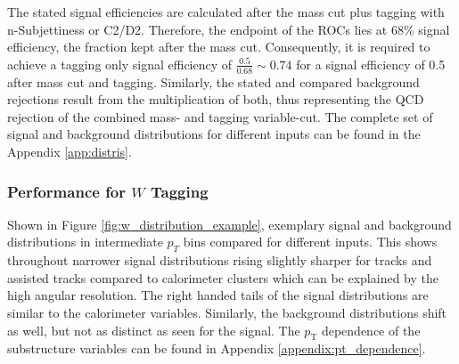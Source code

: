 
The stated signal efficiencies are calculated after the mass cut plus tagging with n-Subjettiness or C2/D2. Therefore, the endpoint of the ROCs lies at 68\% signal efficiency, the fraction kept after the mass cut. Consequently, it is required to achieve a tagging only signal efficiency of $\frac{0.5}{0.68} \sim 0.74$ for a signal efficiency of 0.5 after mass cut and tagging. Similarly, the stated and compared background rejections result from the multiplication of both, thus representing the QCD rejection of the combined mass- and tagging variable-cut. The complete set of signal and background distributions for different inputs can be found in the Appendix \ref{app:distris}.

\subsubsection{Performance for $W$ Tagging}
Shown in Figure \ref{fig:w_distribution_example}, exemplary signal and background distributions in intermediate $p_T$ bins compared for different inputs. This shows throughout narrower signal distributions rising slightly sharper for tracks and assisted tracks compared to calorimeter clusters which can be explained by the high angular resolution. The right handed tails of the signal distributions are similar to the calorimeter variables. Similarly, the background distributions shift as well, but not as distinct as seen for the signal. The $p_{\mathrm{T}}$ dependence of the substructure variables can be found in Appendix \ref{appendix:pt_dependence}.
